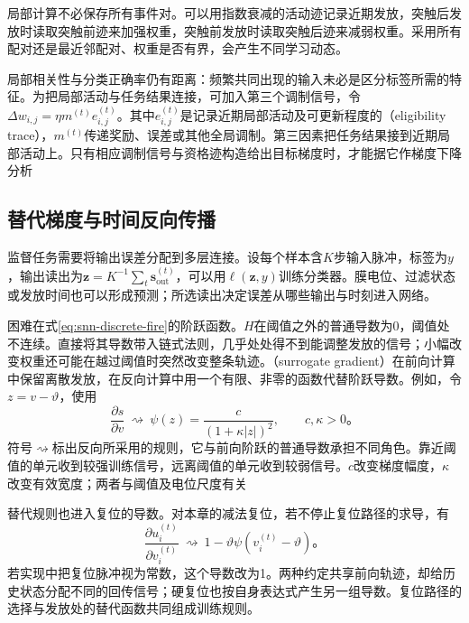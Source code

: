 局部计算不必保存所有事件对。可以用指数衰减的活动迹记录近期发放，突触后发放时读取突触前迹来加强权重，突触前发放时读取突触后迹来减弱权重。采用所有配对还是最近邻配对、权重是否有界，会产生不同学习动态。

局部相关性与分类正确率仍有距离：频繁共同出现的输入未必是区分标签所需的特征。为把局部活动与任务结果连接，可加入第三个调制信号，令$\Delta w_{i,j}=\eta m^{(t)}e_{i,j}^{(t)}$。其中$e_{i,j}^{(t)}$是记录近期局部活动及可更新程度的（eligibility trace），$m^{(t)}$传递奖励、误差或其他全局调制。第三因素把任务结果接到近期局部活动上。只有相应调制信号与资格迹构造给出目标梯度时，才能据它作梯度下降分析

\subsection{替代梯度与时间反向传播}
\label{sec:snn-surrogate}

监督任务需要将输出误差分配到多层连接。设每个样本含$K$步输入脉冲，标签为$y$，输出读出为$\bm z=K^{-1}\sum_t\bm s_{\mathrm{out}}^{(t)}$，可以用$\ell(\bm z,y)$训练分类器。膜电位、过滤状态或发放时间也可以形成预测；所选读出决定误差从哪些输出与时刻进入网络。

困难在式\eqref{eq:snn-discrete-fire}的阶跃函数。$H$在阈值之外的普通导数为0，阈值处不连续。直接将其导数带入链式法则，几乎处处得不到能调整发放的信号；小幅改变权重还可能在越过阈值时突然改变整条轨迹。（surrogate gradient）在前向计算中保留离散发放，在反向计算中用一个有限、非零的函数代替阶跃导数。例如，令$z=v-\vartheta$，使用
\begin{equation}
  \frac{\partial s}{\partial v}\ \rightsquigarrow\
  \psi(z)=\frac{c}{(1+\kappa|z|)^2},\qquad c,\kappa>0\text{。}
  \label{eq:snn-surrogate-derivative}
\end{equation}
符号$\rightsquigarrow$标出反向所采用的规则，它与前向阶跃的普通导数承担不同角色。靠近阈值的单元收到较强训练信号，远离阈值的单元收到较弱信号。$c$改变梯度幅度，$\kappa$改变有效宽度；两者与阈值及电位尺度有关

替代规则也进入复位的导数。对本章的减法复位，若不停止复位路径的求导，有
\begin{equation}
  \frac{\partial u_i^{(t)}}{\partial v_i^{(t)}}
  \ \rightsquigarrow\ 1-\vartheta\psi(v_i^{(t)}-\vartheta)\text{。}
  \label{eq:snn-reset-gradient}
\end{equation}
若实现中把复位脉冲视为常数，这个导数改为1。两种约定共享前向轨迹，却给历史状态分配不同的回传信号；硬复位也按自身表达式产生另一组导数。复位路径的选择与发放处的替代函数共同组成训练规则。

